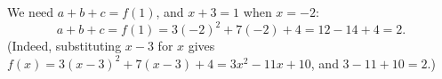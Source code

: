 We need $a+b+c=f(1)$, and $x+3=1$ when $x=-2$:
\[
a+b+c=f(1)=3(-2)^2+7(-2)+4=12-14+4=\boxed{2}.
\]
(Indeed, substituting $x-3$ for $x$ gives $f(x)=3(x-3)^2+7(x-3)+4=3x^2-11x+10$, and $3-11+10=2$.)
